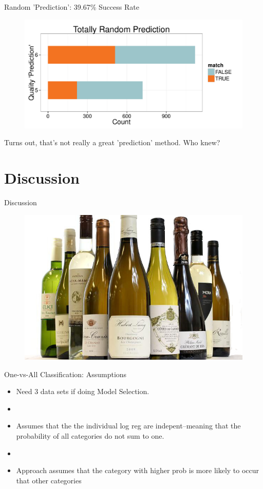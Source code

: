 \documentclass{beamer}
\begin{document}
\begin{frame}{Random 'Prediction': 39.67\% Success Rate}
	\begin{figure}
		\centering
		\includegraphics[width=\textwidth]{../images/RandomPrediction.pdf}
	\end{figure}
	Turns out, that's not really a great 'prediction' method. Who knew?
\end{frame}


\section{Discussion}
\begin{frame}{Discussion}
	\begin{figure}
		\centering
		\includegraphics[width=\textwidth]{../images/wines.jpg}
	\end{figure}
\end{frame}

\begin{frame}{One-vs-All Classification: Assumptions}
	\begin{itemize}
	\item Need 3 data sets if doing Model Selection. 
	\item[]
	\item Assumes that the the individual log reg are indepent--meaning that the probability of all categories do not sum to one. 
	\item[]
	\item Approach assumes that the category with higher prob is more likely to occur that other categories
	\end{itemize}
\end{frame}
\end{document}
